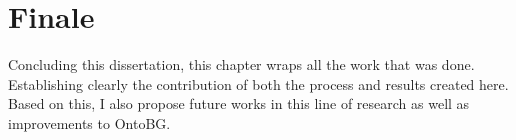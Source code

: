 \chapter{Finale}

Concluding this dissertation, this chapter wraps all the work that was done. Establishing clearly the contribution of both the process and results created here. Based on this, I also propose future works in this line of research as well as improvements to OntoBG.







